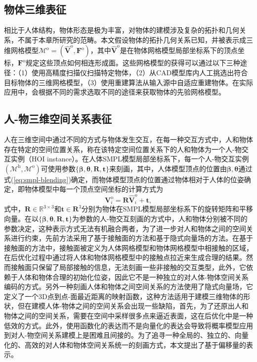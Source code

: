 \subsection{物体三维表征}
相比于人体结构，物体形态是极为丰富，对物体的建模涉及复杂的拓扑和几何关系，不属于本章所研究的范畴。本文假设物体的拓扑几何关系已知，并被表示成三维网格模型$\mathcal{M}^{\text{o}} = (\hat{\mathbf{V}}^{\text{o}}, \mathbf{F}^{\text{o}})$，其中$\hat{\mathbf{V}}^{\text{o}}$是在物体网格模型局部坐标系下的顶点坐标，$\mathbf{F}^{\text{o}}$规定这些顶点如何相连形成面。这些网格模型的获得可以通过以下三种途径：（1）使用高精度扫描仪扫描特定物体，（2）从CAD模型库内人工挑选出符合目标物体的三维网格模型，（3）使用重建算法\citep{BundleSDF}从输入源中自适应重建物体。在实际应用中，会根据不同的需求选取不同的途径来获取物体的先验网格模型。

\subsection{人-物三维空间关系表征}
人在三维空间中通过不同的方式与物体发生交互，在每一种交互方式中，人和物体存在特定的空间位置关系，称在该特定空间位置关系下的人和物体为一个人-物交互实例（HOI instance）。在人体SMPL模型局部坐标系下，每一个人-物交互实例$(\mathcal{M}^{\text{h}},\mathcal{M}^{\text{o}})$可使用参数$\{\mathbf{\beta}, \mathbf{\theta}, \mathbf{R}, \mathbf{t}\}$来刻画，其中，人体模型顶点的位置由${\mathbf{\beta}, \mathbf{\theta}}$通过式(\ref{eq:smpl-blending})确定，而物体模型顶点的位置通过物体相对于人体的位姿确定，即物体模型中每一个顶点空间坐标的计算方式为
\begin{equation}
	\mathbf{V}^{\text{o}}_i = \mathbf{R} \hat{\mathbf{V}}^{\text{o}}_i + \mathbf{t},
\end{equation}
式中，$\mathbf{R}\in\mathbb{R}^{3\times 3}$和$\mathbf{t}\in\mathbf{R}^3$分别为物体在SMPL模型局部坐标系下的旋转矩阵和平移向量。在以$\{\mathbf{\beta}, \mathbf{\theta}, \mathbf{R}, \mathbf{t}\}$为参数的人-物交互刻画的方式中，人和物体分别被不同的参数决定，这种表示方式无法有机融合两者，为了进一步对人和物体之间的空间关系进行约束，先前方法采用了基于接触面的方法和基于隐式向量场的方法。在基于接触面的方法中，接触面被定义为人体网格模型和物体网格模型中相接触的区域，在后优化过程中通过将人体和物体网格模型中的接触点拉近来生成合理的结果。然而接触面只保留了局部接触的信息，无法刻画一些非接触的交互类型，此外，它依赖于人体和物体合理的初始化位姿，因此它不是一种独立的对人体-物体空间关系编码的方式。另外一种刻画人体和物体之间空间关系的方法使用了隐式向量场，它定义了一个3D点到点-面最近距离的映射函数，这种方法适用于建模三维物体的形状，但在建模人体-物体之间的空间关系会出现一些缺陷，首先，为了还原出人和物体之间的空间关系，需要在空间中采样很多点来逼近表面，这在后优化中是一种低效的方式。此外，使用函数化的表达而不是向量化的表达会导致将概率模型应用到对人-物空间关系建模上是困难且间接的。为了追寻一种全局的、独立的、向量化的、高效的对人体和物体空间关系统一的刻画方式，本文提出了基于偏移量的表示。

